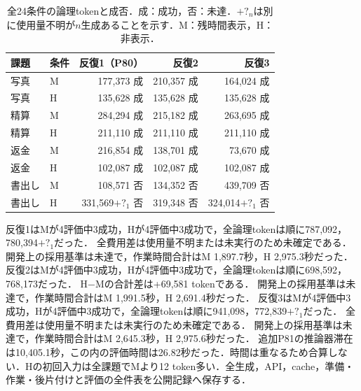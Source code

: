 \begin{table}[tb]
\centering\footnotesize\setlength{\tabcolsep}{1pt}
\caption{全24条件の論理tokenと成否．成：成功，否：未達．$+?_{n}$は別に使用量不明が$n$生成あることを示す．M：残時間表示，H：非表示．}
\begin{tabular}{llrrr}
課題 & 条件 & 反復1（P80） & 反復2 & 反復3 \\ \hline
写真 & M & 177,373 成 & 210,357 成 & 164,024 成 \\
写真 & H & 135,628 成 & 135,628 成 & 135,628 成 \\
精算 & M & 284,294 成 & 215,182 成 & 263,695 成 \\
精算 & H & 211,110 成 & 211,110 成 & 211,110 成 \\
返金 & M & 216,854 成 & 138,701 成 & 73,670 成 \\
返金 & H & 102,087 成 & 102,087 成 & 102,087 成 \\
書出し & M & 108,571 否 & 134,352 否 & 439,709 否 \\
書出し & H & 331,569$+?_{1}$ 否 & 319,348 否 & 324,014$+?_{1}$ 否 \\
\hline
\end{tabular}
\end{table}
反復1はMが4評価中3成功，Hが4評価中3成功で，全論理tokenは順に787,092，780,394$+?_{1}$だった．
全費用差は使用量不明または未実行のため未確定である．
開発上の採用基準は未達で，作業時間合計はM 1,897.7秒，H 2,975.3秒だった．
反復2はMが4評価中3成功，Hが4評価中3成功で，全論理tokenは順に698,592，768,173だった．
H−Mの合計差は+69,581 tokenである．
開発上の採用基準は未達で，作業時間合計はM 1,991.5秒，H 2,691.4秒だった．
反復3はMが4評価中3成功，Hが4評価中3成功で，全論理tokenは順に941,098，772,839$+?_{1}$だった．
全費用差は使用量不明または未実行のため未確定である．
開発上の採用基準は未達で，作業時間合計はM 2,645.3秒，H 2,975.6秒だった．
追加P81の推論器滞在は10,405.1秒，この内の評価時間は26.82秒だった．時間は重なるため合算しない．Hの初回入力は全課題でMより12 token多い．全生成，API，cache，準備・作業・後片付けと評価の全件表を公開記録へ保存する．
